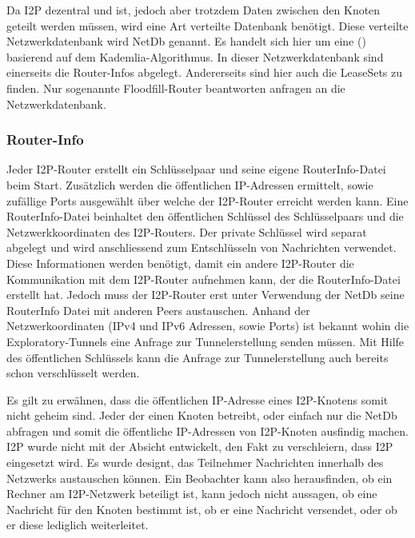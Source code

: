 Da I2P dezentral und  ist, jedoch aber trotzdem Daten zwischen den Knoten geteilt werden müssen, wird eine Art verteilte Datenbank benötigt.
Diese verteilte Netzwerkdatenbank wird NetDb genannt.
Es handelt sich hier um eine  () basierend auf dem Kademlia-Algorithmus.
In dieser Netzwerkdatenbank sind einerseits die Router-Infos abgelegt.
Andererseits sind hier auch die LeaseSets zu finden.
Nur sogenannte Floodfill-Router beantworten anfragen an die Netzwerkdatenbank.
\parencites[S.~5-6]{timpanaro_monitoring_2011}{noauthor_network_nodate}

\subsubsection{Router-Info}\label{sec:router_info}

Jeder I2P-Router erstellt ein Schlüsselpaar und seine eigene RouterInfo-Datei beim Start.
Zusätzlich werden die öffentlichen IP-Adressen ermittelt, sowie zufällige Ports ausgewählt über welche der I2P-Router erreicht werden kann.
Eine RouterInfo-Datei beinhaltet den öffentlichen Schlüssel des Schlüsselpaars und die Netzwerkkoordinaten des I2P-Routers.
Der private Schlüssel wird separat abgelegt und wird anschliessend zum Entschlüsseln von Nachrichten verwendet.
Diese Informationen werden benötigt, damit ein andere I2P-Router die Kommunikation mit dem I2P-Router aufnehmen kann, der die RouterInfo-Datei erstellt hat.
Jedoch muss der I2P-Router erst unter Verwendung der NetDb seine RouterInfo Datei mit anderen Peers austauschen.
Anhand der Netzwerkoordinaten (IPv4 und IPv6 Adressen, sowie Ports) ist bekannt wohin die Exploratory-Tunnels eine Anfrage zur Tunnelerstellung senden müssen.
Mit Hilfe des öffentlichen Schlüssels kann die Anfrage zur Tunnelerstellung auch bereits schon verschlüsselt werden. 

Es gilt zu erwähnen, dass die öffentlichen IP-Adresse eines I2P-Knotens somit nicht geheim sind.
Jeder der einen Knoten betreibt, oder einfach nur die NetDb abfragen und somit die öffentliche IP-Adressen von I2P-Knoten ausfindig machen.
I2P wurde nicht mit der Absicht entwickelt, den Fakt zu verschleiern, dass I2P eingesetzt wird.
Es wurde designt, das Teilnehmer Nachrichten innerhalb des Netzwerks austauschen können. 
Ein Beobachter kann also herausfinden, ob ein Rechner am I2P-Netzwerk beteiligt ist, kann jedoch nicht aussagen, ob eine Nachricht für den Knoten bestimmt ist, ob er eine Nachricht versendet, oder ob er diese lediglich weiterleitet.

